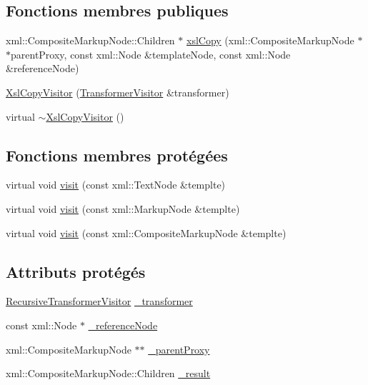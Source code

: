 \subsection*{Fonctions membres publiques}
\begin{DoxyCompactItemize}
\item 
xml::CompositeMarkupNode::Children $\ast$ \hyperlink{classxsl_1_1_xsl_copy_visitor_aa23e5adea50aa3eb5bcb5fa67d32f114}{xslCopy} (xml::CompositeMarkupNode $\ast$$\ast$parentProxy, const xml::Node \&templateNode, const xml::Node \&referenceNode)
\item 
\hyperlink{classxsl_1_1_xsl_copy_visitor_ad46a85993842fdee770e1c54077d29c5}{XslCopyVisitor} (\hyperlink{classxsl_1_1_transformer_visitor}{TransformerVisitor} \&transformer)
\item 
virtual \hyperlink{classxsl_1_1_xsl_copy_visitor_a5ca526697de61e8e0204b23c16efb192}{$\sim$XslCopyVisitor} ()
\end{DoxyCompactItemize}
\subsection*{Fonctions membres protégées}
\begin{DoxyCompactItemize}
\item 
virtual void \hyperlink{classxsl_1_1_xsl_copy_visitor_a25513d10730dfb9d01ca59a354a16e51}{visit} (const xml::TextNode \&templte)
\item 
virtual void \hyperlink{classxsl_1_1_xsl_copy_visitor_a4fe7aa1d1e20b8681509c6e5f3fc36d8}{visit} (const xml::MarkupNode \&templte)
\item 
virtual void \hyperlink{classxsl_1_1_xsl_copy_visitor_aa96cb91d98688a47b027b60a4a2ccc74}{visit} (const xml::CompositeMarkupNode \&templte)
\end{DoxyCompactItemize}
\subsection*{Attributs protégés}
\begin{DoxyCompactItemize}
\item 
\hyperlink{classxsl_1_1_recursive_transformer_visitor}{RecursiveTransformerVisitor} \hyperlink{classxsl_1_1_xsl_copy_visitor_a62a8afbd16b10ef1c0bdf07e7aabf62e}{\_\-transformer}
\item 
const xml::Node $\ast$ \hyperlink{classxsl_1_1_xsl_copy_visitor_afed61bf57de8d216137457a5ac51daad}{\_\-referenceNode}
\item 
xml::CompositeMarkupNode $\ast$$\ast$ \hyperlink{classxsl_1_1_xsl_copy_visitor_aac6b2215ca37aabc57a0693517583583}{\_\-parentProxy}
\item 
xml::CompositeMarkupNode::Children \hyperlink{classxsl_1_1_xsl_copy_visitor_af0d37e73a689f6e2fe7bc081ba0ac25f}{\_\-result}
\end{DoxyCompactItemize}
